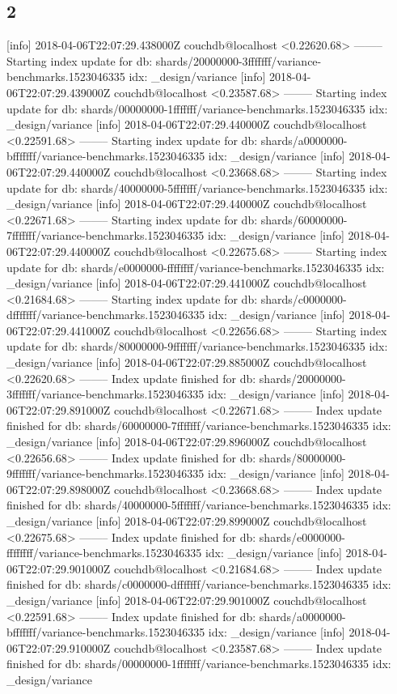 \subsection{2}
[info] 2018-04-06T22:07:29.438000Z couchdb@localhost <0.22620.68> -------- Starting index update for db: shards/20000000-3fffffff/variance-benchmarks.1523046335 idx: _design/variance
[info] 2018-04-06T22:07:29.439000Z couchdb@localhost <0.23587.68> -------- Starting index update for db: shards/00000000-1fffffff/variance-benchmarks.1523046335 idx: _design/variance
[info] 2018-04-06T22:07:29.440000Z couchdb@localhost <0.22591.68> -------- Starting index update for db: shards/a0000000-bfffffff/variance-benchmarks.1523046335 idx: _design/variance
[info] 2018-04-06T22:07:29.440000Z couchdb@localhost <0.23668.68> -------- Starting index update for db: shards/40000000-5fffffff/variance-benchmarks.1523046335 idx: _design/variance
[info] 2018-04-06T22:07:29.440000Z couchdb@localhost <0.22671.68> -------- Starting index update for db: shards/60000000-7fffffff/variance-benchmarks.1523046335 idx: _design/variance
[info] 2018-04-06T22:07:29.440000Z couchdb@localhost <0.22675.68> -------- Starting index update for db: shards/e0000000-ffffffff/variance-benchmarks.1523046335 idx: _design/variance
[info] 2018-04-06T22:07:29.441000Z couchdb@localhost <0.21684.68> -------- Starting index update for db: shards/c0000000-dfffffff/variance-benchmarks.1523046335 idx: _design/variance
[info] 2018-04-06T22:07:29.441000Z couchdb@localhost <0.22656.68> -------- Starting index update for db: shards/80000000-9fffffff/variance-benchmarks.1523046335 idx: _design/variance
[info] 2018-04-06T22:07:29.885000Z couchdb@localhost <0.22620.68> -------- Index update finished for db: shards/20000000-3fffffff/variance-benchmarks.1523046335 idx: _design/variance
[info] 2018-04-06T22:07:29.891000Z couchdb@localhost <0.22671.68> -------- Index update finished for db: shards/60000000-7fffffff/variance-benchmarks.1523046335 idx: _design/variance
[info] 2018-04-06T22:07:29.896000Z couchdb@localhost <0.22656.68> -------- Index update finished for db: shards/80000000-9fffffff/variance-benchmarks.1523046335 idx: _design/variance
[info] 2018-04-06T22:07:29.898000Z couchdb@localhost <0.23668.68> -------- Index update finished for db: shards/40000000-5fffffff/variance-benchmarks.1523046335 idx: _design/variance
[info] 2018-04-06T22:07:29.899000Z couchdb@localhost <0.22675.68> -------- Index update finished for db: shards/e0000000-ffffffff/variance-benchmarks.1523046335 idx: _design/variance
[info] 2018-04-06T22:07:29.901000Z couchdb@localhost <0.21684.68> -------- Index update finished for db: shards/c0000000-dfffffff/variance-benchmarks.1523046335 idx: _design/variance
[info] 2018-04-06T22:07:29.901000Z couchdb@localhost <0.22591.68> -------- Index update finished for db: shards/a0000000-bfffffff/variance-benchmarks.1523046335 idx: _design/variance
[info] 2018-04-06T22:07:29.910000Z couchdb@localhost <0.23587.68> -------- Index update finished for db: shards/00000000-1fffffff/variance-benchmarks.1523046335 idx: _design/variance

